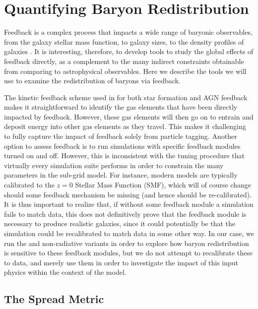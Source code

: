 \section{Quantifying Baryon Redistribution}
\label{sec:feedbackmetrics}

Feedback is a complex process that impacts a wide range of
baryonic observables, from the galaxy stellar mass function, to galaxy sizes,
to the density profiles of galaxies \citep[e.g.][]{BenitezLlambay2018}. It is
interesting, therefore, to develop tools to study the global effects of
feedback directly, as a complement to the many indirect constraints
obtainable from comparing to astrophysical observables. Here we describe the
tools we will use to examine the redistribution of baryons via feedback.

The kinetic feedback scheme used in \simba{} for both star formation and AGN
feedback makes it straightforward to identify the gas elements that have been
directly impacted by feedback. However, these gas elements will then go on to
entrain and deposit energy into other gas elements as they travel. This makes
it challenging to fully capture the impact of feedback solely from particle
tagging. Another option to assess feedback is to run simulations with
specific feedback modules turned on and off. However, this is inconsistent
with the tuning procedure that virtually every simulation suite performs in
order to constrain the many parameters in the sub-grid model. For instance,
modern models are typically calibrated to the $z=0$ Stellar Mass Function
(SMF), which will of course change should some feedback mechanism be missing
(and hence should be re-calibrated). It is thus important to realize that, if
without some feedback module a simulation fails to match data, this does not
definitively prove that the feedback module is necessary to produce realistic
galaxies, since it could potentially be that the simulation could be
recalibrated to match data in some other way. In our case, we run the \nojet{}
and non-radiative variants in order to explore how baryon redistribution is
sensitive to these feedback modules, but we do not attempt to recalibrate
these to data, and merely use them in order to investigate the impact of this
input physics within the context of the \simba{} model.

\subsection{The Spread Metric}


